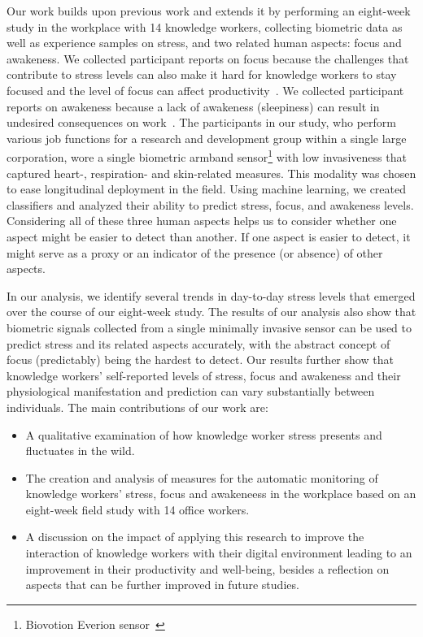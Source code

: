 Our work builds upon previous work and extends it by performing an
eight-week study in the workplace with 14 knowledge workers,
collecting biometric data as well as
experience samples on stress, and two related human aspects: focus and
awakeness. We collected participant reports on focus because the
challenges that contribute to stress levels can also make it hard for
knowledge workers to stay focused and the level of focus
can affect
productivity~\cite{mark2014bored}.  We collected participant reports
on awakeness because a lack of awakeness (sleepiness) can result in
undesired consequences on work~\cite{connor02}.  The participants in
our study, who perform various job functions for a research and
development group within a single large corporation, wore a single
biometric armband sensor\footnote{Biovotion Everion
  sensor~\cite{everion}} with low invasiveness that captured heart-,
respiration- and skin-related measures. This modality was chosen to
ease longitudinal deployment in the field. Using machine learning, we
created classifiers and analyzed their ability to predict stress, focus, and awakeness levels. Considering all of these three human aspects helps us to consider whether one aspect might be easier to detect than another. If one aspect is easier to detect, it might serve
as a proxy or an indicator of the presence (or absence) of other aspects. 


In our analysis, we identify several trends in day-to-day stress levels
that emerged over the course of our eight-week study.  The results of
our analysis also show that biometric signals collected from a single
minimally invasive sensor can be used to predict stress and its
related aspects accurately, with the abstract concept of focus
(predictably) being the hardest to detect. Our results further show
that knowledge workers' self-reported levels of stress, focus and
awakeness and their physiological manifestation and prediction can
vary substantially between individuals.
The main contributions of our work are:
\begin{itemize}
	\item A qualitative examination of how knowledge worker stress presents and fluctuates in the wild.
	\item The creation and analysis of measures for the automatic monitoring of knowledge workers' stress, focus and awakeneess in the workplace based on an eight-week field study with 14 office workers.
	\item A discussion on the impact of applying this research to improve
the interaction of knowledge workers with their digital environment leading to an improvement in their productivity and well-being, besides a reflection on aspects that can be further improved in future studies.
    \end{itemize}

